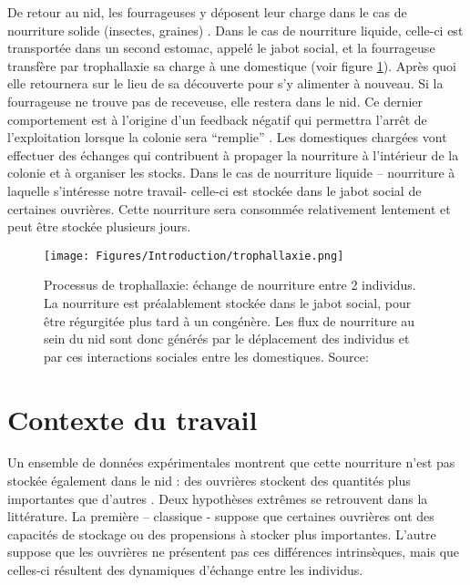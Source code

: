 De retour au nid, les fourrageuses y déposent leur charge dans le cas de nourriture solide (insectes, graines) \citep{reyes-lopez_food_2002}. Dans le cas de nourriture liquide, celle-ci est transportée dans un second estomac, appelé le jabot social, et la fourrageuse transfère par trophallaxie sa charge à une domestique (voir figure \ref{trophallaxie}). Après quoi elle retournera sur le lieu de sa découverte pour s'y alimenter à nouveau. Si la fourrageuse ne trouve pas de receveuse, elle restera dans le nid. Ce dernier comportement est à l'origine d'un feedback négatif qui permettra l'arrêt de l'exploitation lorsque la colonie sera ``remplie'' \citep{mailleux_impact_2010}. Les domestiques chargées vont effectuer des échanges qui contribuent à propager la nourriture à l'intérieur de la colonie et à organiser les stocks. Dans le cas de nourriture liquide – nourriture à laquelle s'intéresse notre travail- celle-ci est stockée dans le jabot social de certaines ouvrières. Cette nourriture sera consommée relativement lentement et peut être stockée plusieurs jours. \\

\begin{figure}[h]
\centering
\texttt{[image: Figures/Introduction/trophallaxie.png]}
\caption{Processus de trophallaxie: échange de nourriture entre 2 individus. La nourriture est préalablement stockée dans le jabot social, pour être régurgitée plus tard à un congénère. Les flux de nourriture au sein du nid sont donc générés par le déplacement des individus et par ces interactions sociales entre les domestiques.  Source: \citep{holldobler_ants_1990}}
\label{trophallaxie}
\end{figure}


\section{Contexte du travail}

Un ensemble de données expérimentales montrent que cette nourriture n'est pas stockée également dans le nid : des ouvrières stockent des quantités plus importantes que d'autres \citep{buffin_feeding_2009,buffin_collective_2012}. Deux hypothèses extrêmes se retrouvent dans la littérature. La première – classique - suppose que certaines ouvrières ont des capacités de stockage ou des propensions à stocker plus importantes. L'autre suppose que les ouvrières ne présentent pas ces différences intrinsèques, mais que celles-ci résultent des dynamiques d'échange entre les individus.\\

